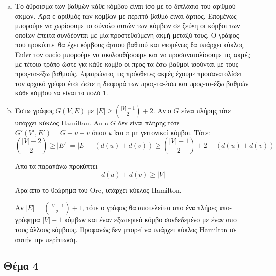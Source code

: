 \documentclass{assignment}
\begin{document}
\begin{enumerate}[(a)]

\item 
Το άθροισμα των βαθμών κάθε κόμβου είναι ίσο με το διπλάσιο του αριθμού ακμών. Άρα ο αριθμός των κόμβων με
περιττό βαθμό είναι άρτιος. Επομένως μπορούμε να χωρίσουμε το σύνολο αυτών των κόμβων σε ζεύγη οι κόμβοι των 
οποίων έπειτα συνδέονται με μία προστεθούμενη ακμή μεταξύ τους. Ο γράφος που προκύπτει θα έχει κόμβους άρτιου βαθμού και επομένως θα υπάρχει
κύκλος \textlatin{Euler} τον οποίο μπορούμε να ακολουθήσουμε και να προσανατολίσουμε τις ακμές με τέτοιο τρόπο
ώστε για κάθε κόμβο οι προς-τα-έσω βαθμοί ισούνται με τους προς-τα-έξω βαθμούς. Αφαιρώντας τις πρόσθετες ακμές έχουμε
προσανατολίσει τον αρχικό γράφο έτσι ώστε η διαφορά των προς-τα-έσω και προς-τα-έξω βαθμών κάθε κόμβου να είναι το πολύ 1.

\item 
Έστω γράφος $G(V, E)$ με $|E| \ge \binom{|V|-1}{2} + 2$. Αν ο $G$ είναι πλήρης τότε υπάρχει κύκλος \textlatin{Hamilton}.
An o $G$ δεν είναι πλήρης τότε $G'(V', E') = G - u - v$ όπου $u$ kαι $v$ μη γειτονικοί κόμβοι. Τότε:
\begin{equation*}
\binom{|V|-2}{2} \ge |E'| = |E| - (d(u) + d(v)) \ge \binom{|V|-1}{2} + 2 - (d(u) + d(v))
\end{equation*}

Απο τα παραπάνω προκύπτει
\begin{equation*}
d(u) + d(v) \ge |V|
\end{equation*}

Άρα απο το θεώρημα του \textlatin{Ore}, υπάρχει κύκλος \textlatin{Hamilton}.

Αν $|E|= \binom{|V|-1}{2} + 1$, τότε ο γράφος θα αποτελείται απο ένα πλήρες υπο-γράφημα $|V|-1$ κόμβων και έναν εξωτερικό κόμβο
συνδεδεμένο με έναν απο τους άλλους κόμβους. Προφανώς δεν μπορεί να υπάρχει κύκλος \textlatin{Hamilton} σε αυτήν την περίπτωση.
\end{enumerate}

\newpage\subsection*{Θέμα 4}
\end{document}
